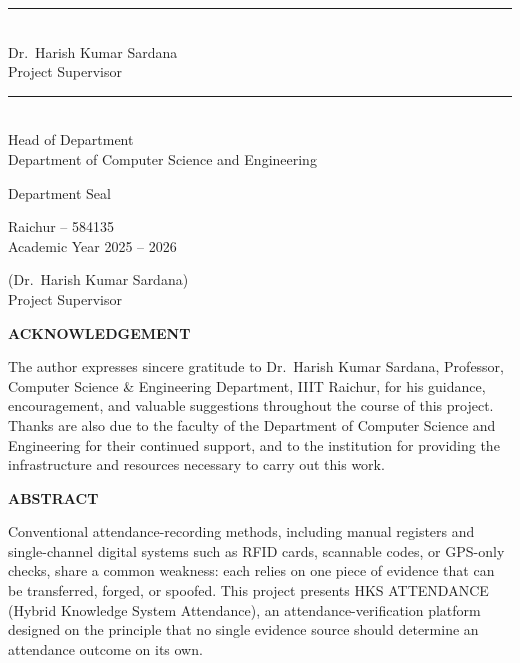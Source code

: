 \documentclass[12pt, a4paper, oneside]{report}
\newcommand{\supervisorName}{Dr.~Harish Kumar Sardana}
\newcommand{\supervisorDesignation}{Professor, Computer Science \& Engineering Department, IIIT Raichur}
\newcommand{\submissionMonthYear}{Academic Year 2025 -- 2026}
\newcommand{\submissionLocation}{Raichur -- 584135}
\newcommand{\frontmatterheading}[1]{%
  \begin{center}\Large\bfseries #1\end{center}
  \vspace{0.5cm}
}
\begin{document}
\vspace{2cm}
\vspace{1.5cm}

\noindent
\begin{minipage}[t]{0.45\textwidth}
\centering
\rule{6cm}{0.4pt}\\
\supervisorName\\
Project Supervisor
\end{minipage}
\hfill
\begin{minipage}[t]{0.45\textwidth}
\centering
\rule{6cm}{0.4pt}\\
Head of Department\\
Department of Computer Science and Engineering
\end{minipage}

\vspace{1.2cm}

\begin{center}
Department Seal
\end{center}

\vspace{1.5cm}
\noindent
\begin{minipage}[t]{0.5\textwidth}
\submissionLocation \\
\submissionMonthYear
\end{minipage}
\hfill
\begin{minipage}[t]{0.4\textwidth}
\raggedleft
(\supervisorName) \\
Project Supervisor
\end{minipage}

\clearpage
\thispagestyle{plain}
\frontmatterheading{ACKNOWLEDGEMENT}

\noindent The author expresses sincere gratitude to \supervisorName{}, \supervisorDesignation{}, for his guidance, encouragement, and valuable suggestions throughout the course of this project. Thanks are also due to the faculty of the Department of Computer Science and Engineering for their continued support, and to the institution for providing the infrastructure and resources necessary to carry out this work.

\clearpage
\thispagestyle{plain}
\frontmatterheading{ABSTRACT}

Conventional attendance-recording methods, including manual registers and single-channel digital systems such as RFID cards, scannable codes, or GPS-only checks, share a common weakness: each relies on one piece of evidence that can be transferred, forged, or spoofed. This project presents HKS ATTENDANCE (Hybrid Knowledge System Attendance), an attendance-verification platform designed on the principle that no single evidence source should determine an attendance outcome on its own.
\end{document}
